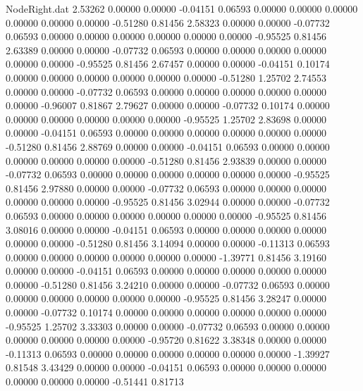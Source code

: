 \begin{filecontents}{NodeRight.dat}
   2.53262    0.00000    0.00000    -0.04151    0.06593    0.00000    0.00000    0.00000    0.00000    0.00000    0.00000   -0.51280    0.81456
   2.58323    0.00000    0.00000    -0.07732    0.06593    0.00000    0.00000    0.00000    0.00000    0.00000    0.00000   -0.95525    0.81456
   2.63389    0.00000    0.00000    -0.07732    0.06593    0.00000    0.00000    0.00000    0.00000    0.00000    0.00000   -0.95525    0.81456
   2.67457    0.00000    0.00000    -0.04151    0.10174    0.00000    0.00000    0.00000    0.00000    0.00000    0.00000   -0.51280    1.25702
   2.74553    0.00000    0.00000    -0.07732    0.06593    0.00000    0.00000    0.00000    0.00000    0.00000    0.00000   -0.96007    0.81867
   2.79627    0.00000    0.00000    -0.07732    0.10174    0.00000    0.00000    0.00000    0.00000    0.00000    0.00000   -0.95525    1.25702
   2.83698    0.00000    0.00000    -0.04151    0.06593    0.00000    0.00000    0.00000    0.00000    0.00000    0.00000   -0.51280    0.81456
   2.88769    0.00000    0.00000    -0.04151    0.06593    0.00000    0.00000    0.00000    0.00000    0.00000    0.00000   -0.51280    0.81456
   2.93839    0.00000    0.00000    -0.07732    0.06593    0.00000    0.00000    0.00000    0.00000    0.00000    0.00000   -0.95525    0.81456
   2.97880    0.00000    0.00000    -0.07732    0.06593    0.00000    0.00000    0.00000    0.00000    0.00000    0.00000   -0.95525    0.81456
   3.02944    0.00000    0.00000    -0.07732    0.06593    0.00000    0.00000    0.00000    0.00000    0.00000    0.00000   -0.95525    0.81456
   3.08016    0.00000    0.00000    -0.04151    0.06593    0.00000    0.00000    0.00000    0.00000    0.00000    0.00000   -0.51280    0.81456
   3.14094    0.00000    0.00000    -0.11313    0.06593    0.00000    0.00000    0.00000    0.00000    0.00000    0.00000   -1.39771    0.81456
   3.19160    0.00000    0.00000    -0.04151    0.06593    0.00000    0.00000    0.00000    0.00000    0.00000    0.00000   -0.51280    0.81456
   3.24210    0.00000    0.00000    -0.07732    0.06593    0.00000    0.00000    0.00000    0.00000    0.00000    0.00000   -0.95525    0.81456
   3.28247    0.00000    0.00000    -0.07732    0.10174    0.00000    0.00000    0.00000    0.00000    0.00000    0.00000   -0.95525    1.25702
   3.33303    0.00000    0.00000    -0.07732    0.06593    0.00000    0.00000    0.00000    0.00000    0.00000    0.00000   -0.95720    0.81622
   3.38348    0.00000    0.00000    -0.11313    0.06593    0.00000    0.00000    0.00000    0.00000    0.00000    0.00000   -1.39927    0.81548
   3.43429    0.00000    0.00000    -0.04151    0.06593    0.00000    0.00000    0.00000    0.00000    0.00000    0.00000   -0.51441    0.81713

\end{filecontents}
